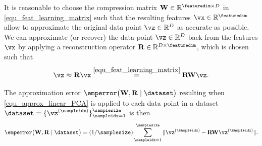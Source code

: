 \documentclass[12pt]{report}
\begin{document}
It is reasonable to choose the compression matrix $\mathbf{W} \in \mathbb{R}^{\featuredim \times D}$ 
in \eqref{equ_feat_learning_matrix} such that the resulting features $\vx \in \mathbb{R}^{\featuredim}$ 
allow to approximate the original data point $\vz \in \mathbb{R}^{D}$ as accurate as possible. We can 
approximate (or recover) the data point $\vz \in \mathbb{R}^{D}$ back from the features $\vx$ by 
applying a reconstruction operator $\mathbf{R} \in \mathbb{R}^{D \times \featuredim}$, which is 
chosen such that 
\begin{equation} 
\label{equ_approx_linear_PCA}
\vz \approx \mathbf{R} \vx \stackrel{\eqref{equ_feat_learning_matrix}}{=} \mathbf{R} \mathbf{W} \vz. 
\end{equation} 

The approximation error $\emperror \big( \mathbf{W},\mathbf{R} \mid \dataset\big)$ resulting 
when \eqref{equ_approx_linear_PCA} is applied to each data point in a 
dataset $\dataset=  \{ \vz^{(\sampleidx)}\}_{\sampleidx=1}^{\samplesize}$ is then
\begin{equation} 
\label{equ_app_error_PCA}
\emperror \big( \mathbf{W},\mathbf{R} \mid \dataset\big) = (1/\samplesize) \sum_{\sampleidx=1}^{\samplesize} \| \vz^{(\sampleidx)} - \mathbf{R} \mathbf{W} \vz^{(\sampleidx)} \|. 
\end{equation} 
\end{document}
